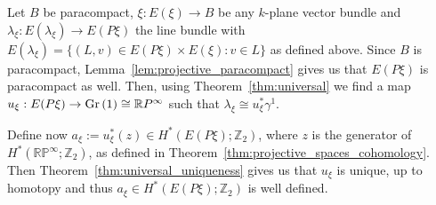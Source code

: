 \begin{remark} Let $B$ be paracompact, $\xi:E(\xi)\to B$ be any $k$-plane vector bundle and $\lambda_{\xi}:E(\lambda_{\xi})\to E(P\xi)$ the line bundle with $E(\lambda_{\xi})=\big\{(L,v)\in E(P\xi)\times E(\xi):v\in L\big\}$ as defined above. Since $B$ is paracompact, Lemma~\ref{lem:projective_paracompact} gives us that $E(P\xi)$ is paracompact as well. Then, using Theorem~\ref{thm:universal} we find a map $u_{\xi}:E(P\xi)\to\Gr{1}\cong\mathbb{R}P^{\infty}$ such that $\lambda_{\xi}\cong u_{\xi}^*\gamma^1$.
\begin{center}
\end{center}
Define now $a_{\xi}:=u_{\xi}^*(z)\in H^*(E(P\xi);\mathbb{Z}_2)$, where $z$ is the generator of $H^*(\mathbb{RP}^{\infty};\mathbb{Z}_2)$, as defined in Theorem~\ref{thm:projective_spaces_cohomology}. Then Theorem~\ref{thm:universal_uniqueness} gives us that $u_{\xi}$ is unique, up to homotopy and thus $a_{\xi}\in H^*(E(P\xi);\mathbb{Z}_2)$ is well defined.
\end{remark}

